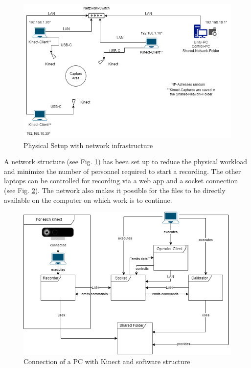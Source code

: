 \documentclass[conference]{IEEEtran}
\begin{document}
\begin{figure}[h]
    \centering
    \includegraphics[width=1.0\linewidth]{Pictures/physical-infrastructure.png}
    \caption{Physical Setup with network infrastructure}
    \label{physical_setup}
\end{figure}

A network structure (see Fig. \ref{physical_setup}) has been set up to reduce the physical workload and minimize the number of personnel required to start a recording. The other laptops can be controlled for recording via a web app and a socket connection (see Fig. \ref{Hirachy}). The network also makes it possible for the files to be directly available on the computer on which work is to continue.

\begin{figure}[h]
    \centering
    \includegraphics[width=1.0\linewidth]{Pictures/Hierachy.drawio.png}
    \caption{Connection of a PC with Kinect and software structure}
    \label{Hirachy}
\end{figure}
\end{document}
